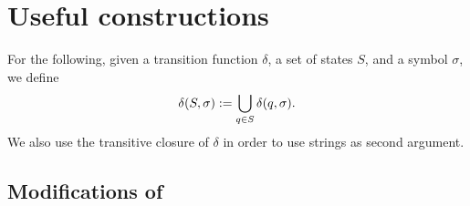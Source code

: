 \chapter{Useful constructions}

For the following, given a transition function $\delta$, a set of states $S$, and a symbol $\sigma$, we define
\begin{equation*}
	\delta(S,\sigma):=\bigcup_{q\in S} \delta(q,\sigma) \text.
\end{equation*}
We also use the transitive closure of $\delta$ in order to use strings as second argument.



\section{Modifications of \NFAs}


